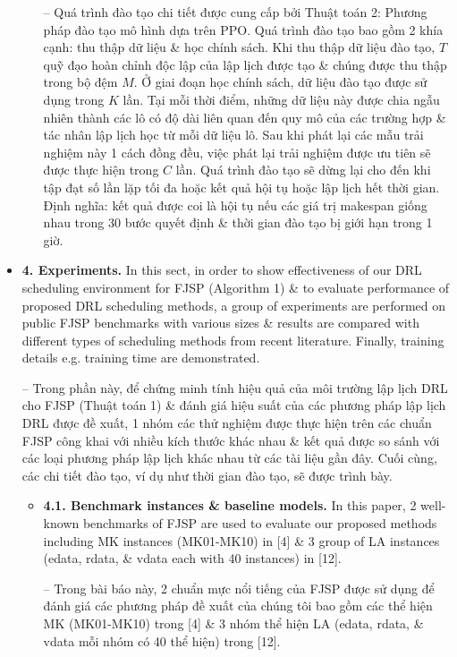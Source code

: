 \documentclass{article}
\begin{document}
\begin{itemize}
\begin{itemize}
        -- Quá trình đào tạo chi tiết được cung cấp bởi {\sf Thuật toán 2: Phương pháp đào tạo mô hình dựa trên PPO}. Quá trình đào tạo bao gồm 2 khía cạnh: thu thập dữ liệu \& học chính sách. Khi thu thập dữ liệu đào tạo, $T$ quỹ đạo hoàn chỉnh độc lập của lập lịch được tạo \& chúng được thu thập trong bộ đệm $M$. Ở giai đoạn học chính sách, dữ liệu đào tạo được sử dụng trong $K$ lần. Tại mỗi thời điểm, những dữ liệu này được chia ngẫu nhiên thành các lô có độ dài liên quan đến quy mô của các trường hợp \& tác nhân lập lịch học từ mỗi dữ liệu lô. Sau khi phát lại các mẫu trải nghiệm này 1 cách đồng đều, việc phát lại trải nghiệm được ưu tiên sẽ được thực hiện trong $C$ lần. Quá trình đào tạo sẽ dừng lại cho đến khi tập đạt số lần lặp tối đa hoặc kết quả hội tụ hoặc lập lịch hết thời gian. Định nghĩa: kết quả được coi là hội tụ nếu các giá trị makespan giống nhau trong 30 bước quyết định \& thời gian đào tạo bị giới hạn trong 1 giờ.
    \end{itemize}
    \item {\bf4. Experiments.} In this sect, in order to show effectiveness of our DRL scheduling environment for FJSP (Algorithm 1) \& to evaluate performance of proposed DRL scheduling methods, a group of experiments are performed on public FJSP benchmarks with various sizes \& results are compared with different types of scheduling methods from recent literature. Finally, training details e.g. training time are demonstrated.

    -- Trong phần này, để chứng minh tính hiệu quả của môi trường lập lịch DRL cho FJSP (Thuật toán 1) \& đánh giá hiệu suất của các phương pháp lập lịch DRL được đề xuất, 1 nhóm các thử nghiệm được thực hiện trên các chuẩn FJSP công khai với nhiều kích thước khác nhau \& kết quả được so sánh với các loại phương pháp lập lịch khác nhau từ các tài liệu gần đây. Cuối cùng, các chi tiết đào tạo, ví dụ như thời gian đào tạo, sẽ được trình bày.
    \begin{itemize}
        \item {\bf4.1. Benchmark instances \& baseline models.} In this paper, 2 well-known benchmarks of FJSP are used to evaluate our proposed methods including MK instances (MK01-MK10) in [4] \& 3 group of LA instances (edata, rdata, \& vdata each with 40 instances) in [12].

        -- Trong bài báo này, 2 chuẩn mực nổi tiếng của FJSP được sử dụng để đánh giá các phương pháp đề xuất của chúng tôi bao gồm các thể hiện MK (MK01-MK10) trong [4] \& 3 nhóm thể hiện LA (edata, rdata, \& vdata mỗi nhóm có 40 thể hiện) trong [12].


\end{itemize}
\end{itemize}
\end{document}
